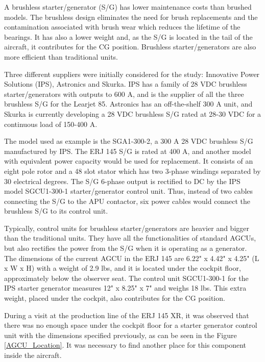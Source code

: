A brushless starter/generator (S/G) has lower maintenance costs than brushed models. The brushless design eliminates the need for brush replacements and the contamination associated with brush wear which reduces the lifetime of the bearings. It has also a lower weight and, as the S/G is located in the tail of the aircraft, it contributes for the CG position. Brushless starter/generators are also more efficient than traditional units.

Three different suppliers were initially considered for the study: Innovative Power Solutions (IPS), Astronics and Skurka. IPS has a family of 28 VDC brushless starter/generators with outputs to 600 A, and is the supplier of all the three brushless S/G for the Learjet 85. Astronics has an off-the-shelf 300 A unit, and Skurka is currently developing a 28 VDC brushless S/G rated at 28-30 VDC for a continuous load of 150-400 A.

The model used as example is the SGA1-300-2, a 300 A 28 VDC brushless S/G manufactured by IPS. The ERJ 145 S/G is rated at 400 A, and another model with equivalent power capacity would be used for replacement. It consists of an eight pole rotor and a 48 slot stator which has two 3-phase windings separated by 30 electrical degrees. The S/G 6-phase output is rectified to DC by the IPS model SGCU1-300-1 starter/generator control unit. Thus, instead of two cables connecting the S/G to the APU contactor, six power cables would connect the brushless S/G to its control unit.

Typically, control units for brushless starter/generators are heavier and bigger than the traditional units. They have all the functionalities of standard AGCUs, but also rectifies the power from the S/G when it is operating as a generator. The dimensions of the current AGCU in the ERJ 145 are 6.22" x 4.42" x 4.25" (L x W x H) with a weight of 2.9 lbs, and it is located under the cockpit floor, approximately below the observer seat. The control unit SGCU1-300-1 for the IPS starter generator measures 12" x 8.25" x 7" and weighs 18 lbs. This extra weight, placed under the cockpit, also contributes for the CG position.

During a visit at the production line of the ERJ 145 XR, it was observed that there was no enough space under the cockpit floor for a starter generator control unit with the dimensions specified previously, as can be seen in the Figure \ref{AGCU_Location}. It was necessary to find another place for this component inside the aircraft.

